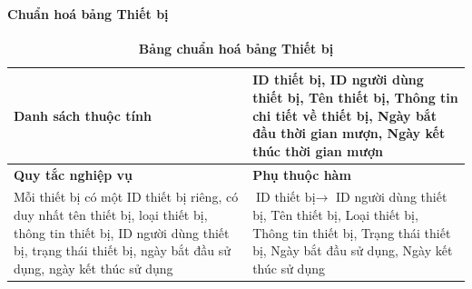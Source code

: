 \paragraph{Chuẩn hoá bảng Thiết bị}
\mbox{}
\begin{table}[H]
	\caption{\bfseries \fontsize{12pt}{0pt}\selectfont Bảng chuẩn hoá bảng Thiết bị}
	\centering
	\begin{tabularx}{0.9\textwidth}{|X|X|}
		\hline
		\textbf{Danh sách thuộc tính} & ID thiết bị, ID người dùng thiết bị, Tên thiết bị, Thông tin chi tiết về thiết bị, Ngày bắt đầu thời gian mượn, Ngày kết thúc thời gian mượn \\
		\hline
		\textbf{Quy tắc nghiệp vụ}    & \textbf{Phụ thuộc hàm}                                                                                                                       \\
		\hline
		Mỗi thiết bị có một ID thiết bị riêng, có duy nhất tên thiết bị, loại thiết bị, thông tin thiết bị,
		ID người dùng thiết bị, trạng thái thiết bị, ngày bắt đầu sử dụng, ngày kết thúc sử dụng
		                              & \parbox[t]{\linewidth}{$\text{ID thiết bị} \rightarrow$ ID người dùng thiết bị, Tên thiết bị,
		Loại thiết bị, Thông tin thiết bị, Trạng thái thiết bị, Ngày bắt đầu sử dụng, Ngày kết thúc sử dụng}                                                                         \\
		\hline
		                                                                                                  \\
		                                                                                                            \\
		\hline
	\end{tabularx}
\end{table}

\cleardoublepage

